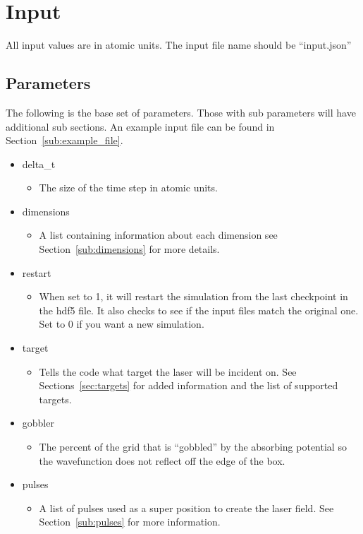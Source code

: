 \documentclass{article}
\begin{document}
\section{Input} %
\label{sec:input}

All input values are in atomic units. The input file name should be ``input.json''

\subsection{Parameters} %
\label{sub:parameters_input}
The following is the base set of parameters. Those with sub parameters will have additional sub sections. An example input file can be found in Section~\ref{sub:example_file}.
\begin{itemize}
	\item delta\_t
	\begin{itemize}
		\item The size of the time step in atomic units.
	\end{itemize}
	\item dimensions
	\begin{itemize}
		\item A list containing information about each dimension see Section~\ref{sub:dimensions} for more details.
	\end{itemize}
	\item restart
	\begin{itemize}
		\item When set to 1, it will restart the simulation from the last checkpoint in the hdf5 file. It also checks to see if the input files match the original one. Set to 0 if you want a new simulation.
	\end{itemize}
	\item target
	\begin{itemize}
		\item Tells the code what target the laser will be incident on. See Sections~\ref{sec:targets} for added information and the list of supported targets.
	\end{itemize}
	\item gobbler
	\begin{itemize}
		\item The percent of the grid that is ``gobbled'' by the absorbing potential so the wavefunction does not reflect off the edge of the box.
	\end{itemize}
	\item pulses
	\begin{itemize}
		\item A list of pulses used as a super position to create the laser field. See Section~\ref{sub:pulses} for more information.
	\end{itemize}
\end{itemize}
\end{document}
